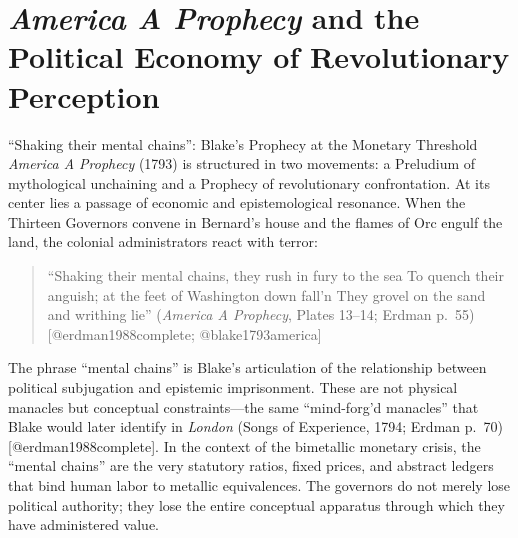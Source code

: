 \documentclass[
  ignorenonframetext,
]{beamer}
\author{\texorpdfstring{}{}}
\date{}
\begin{document}
\section{\texorpdfstring{\emph{America A Prophecy} and the Political
Economy of Revolutionary
Perception}{America A Prophecy and the Political Economy of Revolutionary Perception}}\label{america-a-prophecy-and-the-political-economy-of-revolutionary-perception}

\begin{frame}{``Shaking their mental chains'': Blake's Prophecy at the
Monetary Threshold}
\protect{}\label{shaking-their-mental-chains-blakes-prophecy-at-the-monetary-threshold}
\emph{America A Prophecy} (1793) is structured in two movements: a
Preludium of mythological unchaining and a Prophecy of revolutionary
confrontation. At its center lies a passage of economic and
epistemological resonance. When the Thirteen Governors convene in
Bernard's house and the flames of Orc engulf the land, the colonial
administrators react with terror:

\begin{quote}
``Shaking their mental chains, they rush in fury to the sea To quench
their anguish; at the feet of Washington down fall'n They grovel on the
sand and writhing lie'' (\emph{America A Prophecy}, Plates 13--14;
Erdman p.~55) {[}@erdman1988complete; @blake1793america{]}
\end{quote}

The phrase ``mental chains'' is Blake's articulation of the relationship
between political subjugation and epistemic imprisonment. These are not
physical manacles but conceptual constraints---the same ``mind-forg'd
manacles'' that Blake would later identify in \emph{London} (Songs of
Experience, 1794; Erdman p.~70) {[}@erdman1988complete{]}. In the
context of the bimetallic monetary crisis, the ``mental chains'' are the
very statutory ratios, fixed prices, and abstract ledgers that bind
human labor to metallic equivalences. The governors do not merely lose
political authority; they lose the entire conceptual apparatus through
which they have administered value.
\end{frame}
\end{document}
